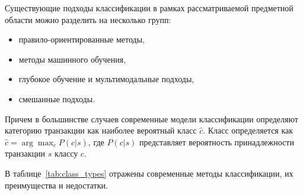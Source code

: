 \documentclass[14pt,a4paper]{extarticle}
\begin{document}
Существующие подходы классификации в рамках рассматриваемой предметной области можно разделить на несколько групп:
\begin{itemize}
\item	правило-ориентированные методы,
\item	методы машинного обучения,
\item	глубокое обучение и мультимодальные подходы,
\item	смешанные подходы.
\end{itemize}

Причем в большинстве случаев современные модели классификации определяют категорию транзакции как наиболее вероятный класс
$\hat{c}$. Класс определяется как $\hat{c} =
\arg\max_c P(c|s)
$, где $P(c|s)$ представляет вероятность принадлежности
транзакции $s$ классу $c$.

В таблице~\ref{tab:class_types} отражены современные методы классификации, их преимущества и недостатки.
\end{document}
